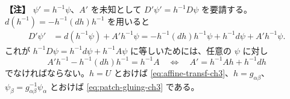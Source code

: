 \documentclass[uplatex, dvipdfmx, book]{jsbook}
\newenvironment{note}{\vspace{1ex}\par\footnotesize\noindent\textbf{【注】}}{\par\vspace{1ex}}
\begin{document}
\begin{note}
$\psi' = h^{-1}\psi$、$A'$ を未知として $D'\psi' = h^{-1}D\psi$ を要請する。$d(h^{-1}) = -h^{-1}(dh)h^{-1}$ を用いると
\begin{align*}
    D'\psi' &= d(h^{-1}\psi) + A'h^{-1}\psi
    = -h^{-1}(dh)h^{-1}\psi + h^{-1}d\psi + A'h^{-1}\psi .
\end{align*}
これが $h^{-1}D\psi = h^{-1}d\psi + h^{-1}A\psi$ に等しいためには、任意の $\psi$ に対し
\begin{equation*}
    A'h^{-1} - h^{-1}(dh)h^{-1} = h^{-1}A
    \quad\Longleftrightarrow\quad
    A' = h^{-1}Ah + h^{-1}dh
\end{equation*}
でなければならない。$h = U$ とおけば \eqref{eq:affine-transf-ch3}、$h = g_{\alpha\beta}$、$\psi_\beta = g_{\alpha\beta}^{-1}\psi_\alpha$ とおけば \eqref{eq:patch-gluing-ch3} である。
\end{note}
\end{document}
